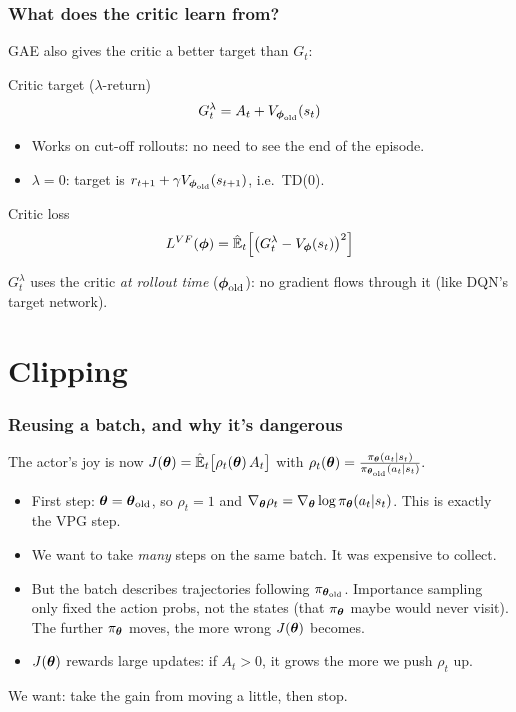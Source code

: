 \begin{frame}
    \frametitle{What does the critic learn from?}
    GAE also gives the critic a better target than $G_t$:
    \begin{block}{Critic target ($\lambda$-return)}
        $$
        G^\lambda_t = A_t + V_{{\boldsymbol{\phi}}_{\text{old}}}(s_t)
        $$
    \end{block}
    \pause
    \begin{itemize}
        \item Works on cut-off rollouts: no need to see the end of the episode.
        \item $\lambda = 0$: target is $r_{t+1} + \gamma V_{{\boldsymbol{\phi}}_{\text{old}}}(s_{t+1})$, i.e.\ TD(0).
    \end{itemize}
    \pause
    \begin{block}{Critic loss}
        $$
        L^{VF}({\boldsymbol{\phi}}) = \hat{\mathbb{E}}_t\Big[\big(G^\lambda_t - V_{\boldsymbol{\phi}}(s_t)\big)^2 \Big]
        $$
    \end{block}
    $G^\lambda_t$ uses the critic \textit{at rollout time} (${\boldsymbol{\phi}}_{\text{old}}$): 
    no gradient flows through it (like DQN's target network).
\end{frame}

\section{Clipping}

\begin{frame}
    \frametitle{Reusing a batch, and why it's dangerous}
    The actor's joy is now
    $
    J({\boldsymbol{\theta}}) = \hat{\mathbb{E}}_t\big[\rho_t({\boldsymbol{\theta}})\,A_t\big]
    $
    with
    $
    \rho_t({\boldsymbol{\theta}}) = \frac{\pi_{\boldsymbol{\theta}}(a_t|s_t)}{\pi_{{\boldsymbol{\theta}}_{\text{old}}}(a_t|s_t)}.
    $
    \begin{itemize}
        \pause
        \item First step: ${\boldsymbol{\theta}} = {\boldsymbol{\theta}}_{\text{old}}$, so $\rho_t = 1$ and
        $\nabla_{\boldsymbol{\theta}} \rho_t = \nabla_{\boldsymbol{\theta}} \log \pi_{\boldsymbol{\theta}}(a_t|s_t)$.
        This is exactly the VPG step.
        \pause
        \item We want to take \textit{many} steps on the same batch. It was expensive to collect.
        \pause
        \item But the batch describes trajectories following $\pi_{{\boldsymbol{\theta}}_{\text{old}}}$.
        Importance sampling only fixed the action probs, not the states (that $\pi_{\boldsymbol{\theta}}$ maybe would never visit).
        The further $\pi_{\boldsymbol{\theta}}$ moves, the more wrong $J({\boldsymbol{\theta}})$ becomes.
        \pause
        \item $J({\boldsymbol{\theta}})$ rewards large updates: if $A_t > 0$, it grows
        the more we push $\rho_t$ up.
    \end{itemize}
    \pause
    \vspace{0.2cm}
    We want: take the gain from moving a little, then stop.
\end{frame}

